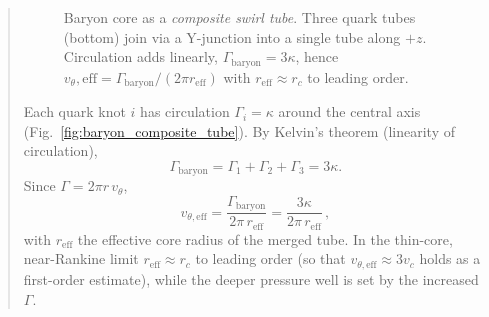 \documentclass[preprint]{revtex4-2}
\begin{document}
\begin{abstract}
\begin{figure}[htbp]
{
                    }
                    \caption{Baryon core as a \emph{composite swirl tube}. Three quark tubes (bottom) join via a Y-junction into a single tube along $+z$. Circulation adds linearly, $\Gamma_\text{baryon}=3\kappa$, hence $v_\theta , \textrm{eff}=\Gamma_\text{baryon}/(2\pi r_\text{eff})$ with $r_\text{eff}\approx r_c$ to leading order.}
                    \label{fig:three-knot-gallery}
                \end{figure}

                Each quark knot $i$ has circulation $\Gamma_i = \kappa$ around the central axis (Fig.~\ref{fig:baryon_composite_tube}).
                By Kelvin’s theorem (linearity of circulation),
                \begin{equation}
                    \Gamma_{\mathrm{baryon}}=\Gamma_1+\Gamma_2+\Gamma_3=3\kappa.
                \end{equation}
                Since $\Gamma=2\pi r\,v_\theta$,
                \begin{equation}
                    \boxed{\;
                    v_{\theta,\mathrm{eff}}=\frac{\Gamma_{\mathrm{baryon}}}{2\pi\,r_{\mathrm{eff}}}
                        =\frac{3\kappa}{2\pi\,r_{\mathrm{eff}}}\,,
                        \;}\label{eq:baryon-vtheta}
                \end{equation}
                with $r_{\mathrm{eff}}$ the effective core radius of the merged tube. In the thin-core, near-Rankine limit $r_{\mathrm{eff}}\approx r_c$ to leading order (so that $v_{\theta,\mathrm{eff}}\approx 3 v_c$ holds as a first-order estimate), while the deeper pressure well is set by the increased $\Gamma$.


\end{abstract}
\end{document}
